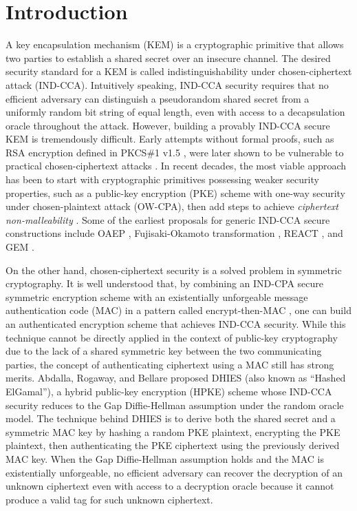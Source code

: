\documentclass[journal=tches,submission]{iacrtrans}
\begin{document}
\section{Introduction}\label{sec:introduction}
A key encapsulation mechanism (KEM) \cite{DBLP:journals/iacr/Shoup01} is a cryptographic primitive that allows two parties to establish a shared secret over an insecure channel. The desired security standard for a KEM is called indistinguishability under chosen-ciphertext attack (IND-CCA). Intuitively speaking, IND-CCA security requires that no efficient adversary can distinguish a pseudorandom shared secret from a uniformly random bit string of equal length, even with access to a decapsulation oracle throughout the attack. However, building a provably IND-CCA secure KEM is tremendously difficult. Early attempts without formal proofs, such as RSA encryption defined in PKCS\#1 v1.5 \cite{DBLP:journals/rfc/rfc2313}, were later shown to be vulnerable to practical chosen-ciphertext attacks \cite{DBLP:conf/crypto/Bleichenbacher98}. In recent decades, the most viable approach has been to start with cryptographic primitives possessing weaker security properties, such as a public-key encryption (PKE) scheme with one-way security under chosen-plaintext attack (OW-CPA), then add steps to achieve \emph{ciphertext non-malleability} \cite{DBLP:conf/asiacrypt/BellareN00}. Some of the earliest proposals for generic IND-CCA secure constructions include OAEP \cite{DBLP:conf/eurocrypt/BellareR94}, Fujisaki-Okamoto transformation \cite{DBLP:conf/crypto/FujisakiO99}\cite{DBLP:journals/joc/FujisakiO13}, REACT \cite{DBLP:conf/ctrsa/OkamotoP01}, and GEM \cite{DBLP:conf/ctrsa/CoronHJPPT02}.

On the other hand, chosen-ciphertext security is a solved problem in symmetric cryptography. It is well understood that, by combining an IND-CPA secure symmetric encryption scheme with an existentially unforgeable message authentication code (MAC) in a pattern called encrypt-then-MAC \cite{DBLP:conf/crypto/Krawczyk01}, one can build an authenticated encryption scheme \cite{DBLP:conf/asiacrypt/BellareN00} that achieves IND-CCA security. While this technique cannot be directly applied in the context of public-key cryptography due to the lack of a shared symmetric key between the two communicating parties, the concept of authenticating ciphertext using a MAC still has strong merits. Abdalla, Rogaway, and Bellare proposed DHIES (also known as ``Hashed ElGamal'')\cite{DBLP:journals/iacr/AbdallaBR99}\cite{DBLP:conf/ctrsa/AbdallaBR01}, a hybrid public-key encryption (HPKE) scheme whose IND-CCA security reduces to the Gap Diffie-Hellman assumption \cite{DBLP:conf/pkc/OkamotoP01} under the random oracle model. The technique behind DHIES is to derive both the shared secret and a symmetric MAC key by hashing a random PKE plaintext, encrypting the PKE plaintext, then authenticating the PKE ciphertext using the previously derived MAC key. When the Gap Diffie-Hellman assumption holds and the MAC is existentially unforgeable, no efficient adversary can recover the decryption of an unknown ciphertext even with access to a decryption oracle because it cannot produce a valid tag for such unknown ciphertext.
\end{document}
